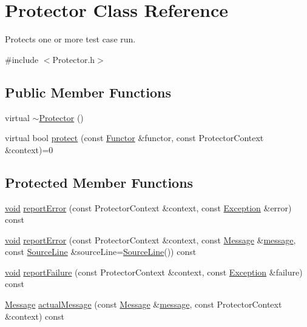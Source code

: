 \hypertarget{class_protector}{\section{Protector Class Reference}
\label{class_protector}
}


Protects one or more test case run.  




{\ttfamily \#include $<$Protector.\-h$>$}

\subsection*{Public Member Functions}
\begin{DoxyCompactItemize}
\item 
virtual \hyperlink{class_protector_ac8382db0ff9d79c53499b1ad362e94fa}{$\sim$\-Protector} ()
\item 
virtual bool \hyperlink{class_protector_a8e005ff581ca40431526fb873a03415a}{protect} (const \hyperlink{class_functor}{Functor} \&functor, const Protector\-Context \&context)=0
\end{DoxyCompactItemize}
\subsection*{Protected Member Functions}
\begin{DoxyCompactItemize}
\item 
\hyperlink{wglew_8h_aeea6e3dfae3acf232096f57d2d57f084}{void} \hyperlink{class_protector_a94c08e57ebcf59ed093916c16384c99a}{report\-Error} (const Protector\-Context \&context, const \hyperlink{class_exception}{Exception} \&error) const 
\item 
\hyperlink{wglew_8h_aeea6e3dfae3acf232096f57d2d57f084}{void} \hyperlink{class_protector_ab1fda7a5e61e2033e2a7b848aa04690a}{report\-Error} (const Protector\-Context \&context, const \hyperlink{class_message}{Message} \&\hyperlink{glew_8h_a76333d9470ffdd4811326932394d36da}{message}, const \hyperlink{class_source_line}{Source\-Line} \&source\-Line=\hyperlink{class_source_line}{Source\-Line}()) const 
\item 
\hyperlink{wglew_8h_aeea6e3dfae3acf232096f57d2d57f084}{void} \hyperlink{class_protector_ac52d8e2909a5621d2692ec3ce5d4dbc7}{report\-Failure} (const Protector\-Context \&context, const \hyperlink{class_exception}{Exception} \&failure) const 
\item 
\hyperlink{class_message}{Message} \hyperlink{class_protector_a259356bbf5f03e07f75ac797c9e34737}{actual\-Message} (const \hyperlink{class_message}{Message} \&\hyperlink{glew_8h_a76333d9470ffdd4811326932394d36da}{message}, const Protector\-Context \&context) const 
\end{DoxyCompactItemize}


